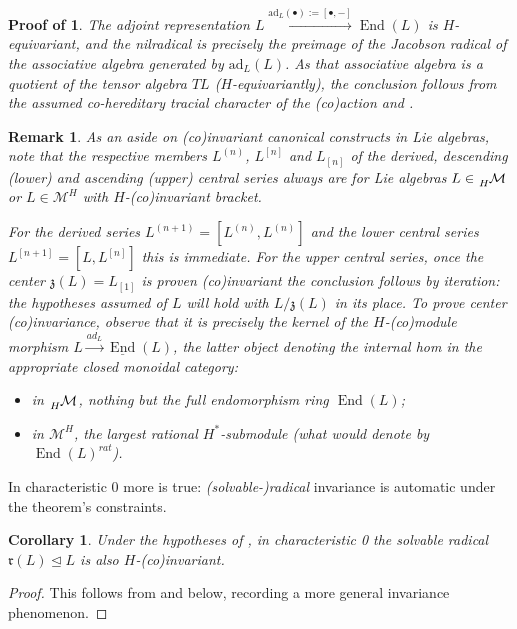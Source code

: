 \documentclass[11pt,leqno]{article}
\theoremstyle{plain}
\newtheorem{corollary}[lemma]{Corollary}
\theoremstyle{plain}
\theoremstyle{plain}
\newtheorem{remark}[lemma]{Remark}
\numberwithin{equation}{section}
\theoremstyle{nonumberplain}
\newtheorem{proof}{Proof}
\newcommand\pf[1]{\newtheorem{#1}{Proof of \Cref{#1}}}
\newcommand\cM{{\mathcal M}}
\newcommand\fr{{\mathfrak r}}
\newcommand\fz{{\mathfrak z}}
\newcommand\1{{\bf 1}}
\DeclareMathOperator{\End}{\mathrm{End}}
\begin{document}
\pf{th:leaves.lie.nil.rad.inv}
\begin{th:leaves.lie.nil.rad.inv}
  The adjoint representation $L\xrightarrow{\mathrm{ad}_{L}(\bullet):=[\bullet,-]}\End(L)$ is $H$-equivariant, and the nilradical is precisely \cite[\S II.3, Theorem 3]{jac_lie_1979} the preimage of the Jacobson radical of the associative algebra generated by $\mathrm{ad}_L(L)$. As that associative algebra is a quotient of the tensor algebra $TL$ ($H$-equivariantly), the conclusion follows from the assumed co-hereditary tracial character of the (co)action and . 
\end{th:leaves.lie.nil.rad.inv}

\begin{remark}\label{re:series.inv}
  As an aside on (co)invariant canonical constructs in Lie algebras, note that the respective members $L^{(n)}$, $L^{[n]}$ and $L_{[n]}$ of the \emph{derived, descending (lower) and ascending (upper) central series} \cite[\S\S I.1.5, I.1.6]{bourb_lie_1-3} always are for Lie algebras $L\in \tensor*[_H]{\cM}{}$ or $L\in \cM^H$ with $H$-(co)invariant bracket.

  For the derived series $L^{(n+1)}=\left[L^{(n)},L^{(n)}\right]$ and the lower central series $L^{[n+1]}=\left[L,L^{[n]}\right]$ this is immediate. For the upper central series, once the center $\fz(L)=L_{[1]}$ is proven (co)invariant the conclusion follows by iteration: the hypotheses assumed of $L$ will hold with $L/\fz(L)$ in its place. To prove center (co)invariance, observe that it is precisely the kernel of the $H$-(co)module morphism $L\xrightarrow{ad_L}\underline{\End}(L)$, the latter object denoting the \emph{internal hom} \cite[\S 1.5]{kly} in the appropriate \emph{closed monoidal} category:
  \begin{itemize}[wide]
  \item in $\tensor*[_H]{\cM}{}$, nothing but the full endomorphism ring $\End(L)$;
  \item in $\cM^H$, the largest \emph{rational} $H^*$-submodule (what \cite[Theorem 2.1.3(d)]{swe} would denote by $\End(L)^{rat}$).
  \end{itemize}
\end{remark}

In characteristic 0 more is true: \emph{(solvable-)radical} \cite[\S I.7, post Proposition 4]{jac_lie_1979} invariance is automatic under the theorem's constraints.

\begin{corollary}\label{cor:both.inv.char0}
  Under the hypotheses of , in characteristic 0 the solvable radical $\fr(L)\trianglelefteq L$ is also $H$-(co)invariant.
\end{corollary}
\begin{proof}
  This follows from  and  below, recording a more general invariance phenomenon.
\end{proof}
\end{document}
